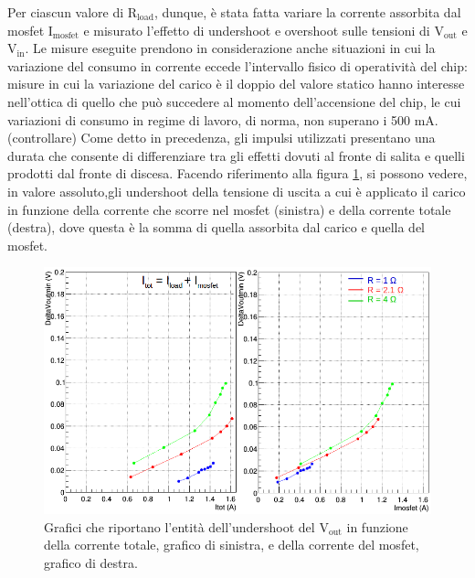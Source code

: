 Per ciascun valore di $\mathrm{R_{load}}$, dunque, è stata fatta variare la corrente assorbita dal mosfet $\mathrm{I_{mosfet}}$ e misurato l'effetto di undershoot e overshoot sulle tensioni di $\mathrm{V_{out}}$ e $\mathrm{V_{in}}$. 
Le misure eseguite prendono in considerazione anche situazioni in cui la variazione del consumo in corrente eccede l'intervallo fisico di operatività del chip: misure in cui la variazione del carico è il doppio del valore statico hanno interesse nell'ottica di quello che può succedere al momento dell'accensione del chip, le cui variazioni di consumo in regime di lavoro, di norma, non superano i 500 mA.(controllare) 
Come detto in precedenza, gli impulsi utilizzati presentano una durata che consente di differenziare tra gli effetti dovuti al fronte di salita e quelli prodotti dal fronte di discesa. 
Facendo riferimento alla figura \ref{VoutUnd}, si possono vedere, in valore assoluto,gli undershoot della tensione di uscita a cui è applicato il carico in funzione della corrente che scorre nel mosfet (sinistra) e della corrente totale (destra), dove questa è la somma di quella assorbita dal carico e quella del mosfet. 
\begin{figure}
\centering
\includegraphics[width=0.9\linewidth]{Immagini/VoutUnd}
\caption{Grafici che riportano l'entità dell'undershoot del $\mathrm{V_{out}}$ in funzione della corrente totale, grafico di sinistra, e della corrente del mosfet, grafico di destra.}
\label{VoutUnd}
\end{figure}
